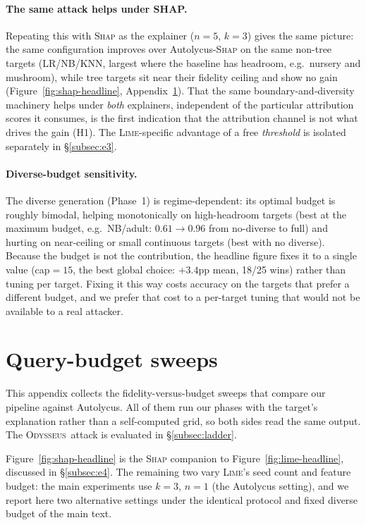 \documentclass[sigconf,anonymous,review]{acmart}
\newcommand{\sys}{\textsc{Odysseus}}
\begin{document}
\paragraph{The same attack helps under SHAP.}
Repeating this with \textsc{Shap} as the explainer ($n{=}5$, $k{=}3$) gives the same picture: the
same configuration improves over Autolycus-\textsc{Shap} on the same non-tree targets (LR/NB/KNN,
largest where the baseline has headroom, e.g.\ nursery and mushroom), while tree targets sit near
their fidelity ceiling and show no gain (Figure~\ref{fig:shap-headline}, Appendix~\ref{app:sweeps}).
That the same boundary-and-diversity machinery helps under \emph{both} explainers, independent of the particular attribution scores it consumes, is the first indication that the attribution channel is
not what drives the gain (H1). The \textsc{Lime}-specific advantage of a free \emph{threshold} is
isolated separately in \S\ref{subsec:e3}.

\paragraph{Diverse-budget sensitivity.}
The diverse generation (Phase~1) is regime-dependent: its optimal budget is roughly bimodal,
helping monotonically on high-headroom targets (best at the maximum budget, e.g.\ NB/adult:
$0.61{\to}0.96$ from no-diverse to full) and hurting on near-ceiling or small continuous targets
(best with no diverse). Because the budget is not the contribution, the headline figure fixes it
to a single value (cap${=}15$, the best global choice: $+3.4$pp mean, 18/25 wins) rather than
tuning per target. Fixing it this way costs accuracy on the targets that prefer a different budget,
and we prefer that cost to a per-target tuning that would not be available to a real attacker.

\section{Query-budget sweeps}
\label{app:sweeps}
\label{app:robustness}
This appendix collects the fidelity-versus-budget sweeps that compare our pipeline against Autolycus.
All of them run our phases with the target's explanation rather than a self-computed grid, so both
sides read the same output. The \sys\ attack is evaluated in \S\ref{subsec:ladder}.

Figure~\ref{fig:shap-headline} is the \textsc{Shap} companion to Figure~\ref{fig:lime-headline},
discussed in \S\ref{subsec:e4}. The remaining two vary \textsc{Lime}'s seed count and feature budget:
the main experiments use $k{=}3$, $n{=}1$ (the Autolycus setting), and we report here two alternative
settings under the identical protocol and fixed diverse budget of the main text.
\end{document}
